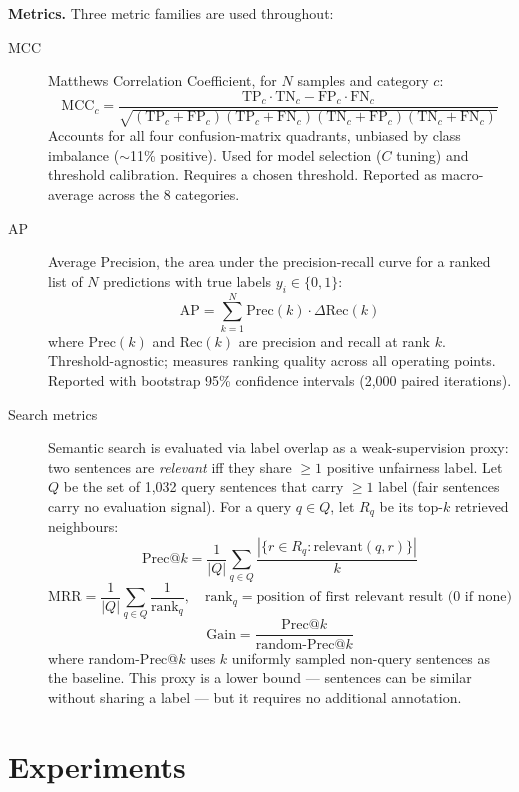 \documentclass[11pt,a4paper]{article}
\begin{document}
\textbf{Metrics.}  Three metric families are used throughout:

\begin{description}
\item[MCC] Matthews Correlation Coefficient, for $N$ samples and
  category $c$:
  \[\text{MCC}_c =
    \frac{\text{TP}_c \cdot \text{TN}_c -
          \text{FP}_c \cdot \text{FN}_c}
         {\sqrt{(\text{TP}_c+\text{FP}_c)(\text{TP}_c+\text{FN}_c)
                (\text{TN}_c+\text{FP}_c)(\text{TN}_c+\text{FN}_c)}}\]
  Accounts for all four confusion-matrix quadrants, unbiased by class
  imbalance ($\sim$11\% positive).  Used for model selection ($C$
  tuning) and threshold calibration.  Requires a chosen threshold.
  Reported as macro-average across the 8 categories.
\item[AP] Average Precision, the area under the precision-recall curve
  for a ranked list of $N$ predictions with true labels $y_i \in
  \{0,1\}$:
  \[\text{AP} = \sum_{k=1}^{N} \text{Prec}(k) \cdot
    \Delta\text{Rec}(k)\]
  where $\text{Prec}(k)$ and $\text{Rec}(k)$ are precision and
  recall at rank $k$.  Threshold-agnostic; measures ranking quality
  across all operating points.  Reported with bootstrap 95\%
  confidence intervals (2,000 paired iterations).
\item[Search metrics] Semantic search is evaluated via label overlap as
  a weak-supervision proxy: two sentences are \emph{relevant} iff they
  share $\ge 1$ positive unfairness label.  Let $Q$ be the set of
  1,032 query sentences that carry $\ge 1$ label (fair sentences
  carry no evaluation signal).  For a query $q \in Q$, let $R_q$ be
  its top-$k$ retrieved neighbours:
  \[\text{Prec}@k = \frac{1}{|Q|} \sum_{q \in Q}
    \frac{|\{r \in R_q : \text{relevant}(q, r)\}|}{k}\]
  \[\text{MRR} = \frac{1}{|Q|} \sum_{q \in Q}
    \frac{1}{\text{rank}_q},\quad
    \text{rank}_q = \text{position of first relevant result (0 if none)}\]
  \[\text{Gain} = \frac{\text{Prec}@k}{\text{random-Prec}@k}\]
  where random-Prec@$k$ uses $k$ uniformly sampled non-query
  sentences as the baseline.  This proxy is a lower bound ---
  sentences can be similar without sharing a label --- but it
  requires no additional annotation.
\end{description}

\section{Experiments}
\end{document}
